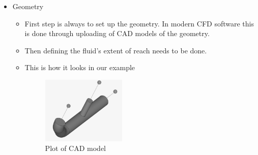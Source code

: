 \documentclass[12pt]{article}
\begin{document}
\begin{itemize}
    \item Geometry
    \begin{itemize}
        \item First step is always to set up the geometry. In modern CFD software this is done through uploading of CAD models of the geometry.
        \item Then defining the fluid's extent of reach needs to be done.
        \item This is how it looks in our example
        \begin{figure}[hbt!]
  \centering
  \includegraphics[width=4cm]{plot4.png}
  \caption{Plot of CAD model\label{fig:fig1}}
\end{figure}
\FloatBarrier 


\end{itemize}
\end{itemize}
\end{document}
